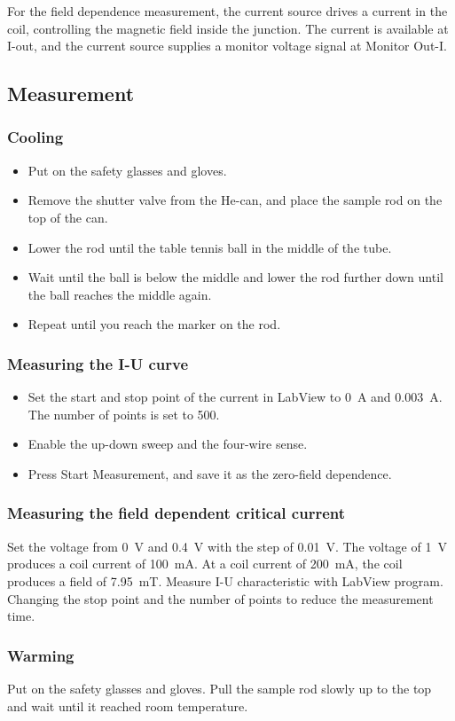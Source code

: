 For the field dependence measurement, the current source drives a current in the coil, controlling the magnetic field inside the junction. The current is available at I-out, and the current source supplies a monitor voltage signal at Monitor Out-I. 


\subsection{Measurement}
\subsubsection{Cooling}

\begin{itemize}

\item Put on the safety glasses and gloves.
\item Remove the shutter valve from the He-can, and place the sample rod on the top of the can.
\item Lower the rod until the table tennis ball in the middle of the tube.
\item Wait until the ball is below the middle and lower the rod further down until the ball reaches the middle again.
\item Repeat until you reach the marker on the rod.

\end{itemize}

\subsubsection{Measuring the I-U curve}

\begin{itemize}

\item Set the start and stop point of the current in LabView to \SI{0}{A} and \SI{0.003}{A}. The number of points is set to 500.
\item Enable the up-down sweep and the four-wire sense.
\item Press Start Measurement, and save it as the zero-field dependence.

\end{itemize}


\subsubsection{Measuring the field dependent critical current}
Set the voltage from \SI{0}{V} and \SI{0.4}{V} with the step of \SI{0.01}{V}. The voltage of \SI{1}{V} produces a coil current of \SI{100}{mA}. At a coil current of \SI{200}{mA}, the coil produces a field of \SI{7.95}{mT}. Measure I-U characteristic with LabView program. Changing the stop point and the number of points to reduce the measurement time.

\subsubsection{Warming}
Put on the safety glasses and gloves. Pull the sample rod slowly up to the top and wait until it reached room temperature.
